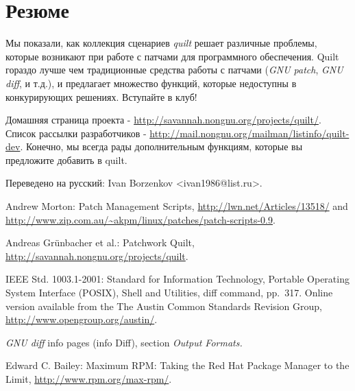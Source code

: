 \documentclass{article}
\newcommand{\prog}[1]{\textit{#1}}
\begin{document}


\section{Резюме}

Мы показали, как коллекция сценариев \textit{quilt} решает различные проблемы, которые возникают при работе с патчами для программного обеспечения. Quilt гораздо лучше чем традиционные средства работы с патчами (\prog{GNU patch}, \prog{GNU diff}, и т.д.), и предлагает множество функций, которые недоступны в конкурирующих решениях. Вступайте в клуб!

Домашняя страница проекта - \url{http://savannah.nongnu.org/projects/quilt/}. Список рассылки разработчиков - \url{http://mail.nongnu.org/mailman/listinfo/quilt-dev}.
Конечно, мы всегда рады дополнительным функциям, которые вы предложите добавить в quilt.

Переведено на русский: Ivan Borzenkov <ivan1986@list.ru>.

\begin{thebibliography}{XX}

Andrew Morton: Patch Management Scripts,
\url{http://lwn.net/Articles/13518/} and
\url{http://www.zip.com.au/~akpm/linux/patches/patch-scripts-0.9}.

Andreas Grünbacher et al.: Patchwork Quilt,
\url{http://savannah.nongnu.org/projects/quilt}.

IEEE Std. 1003.1-2001: Standard for Information Technology, Portable
Operating System Interface (POSIX), Shell and Utilities, diff
command, pp.~317. Online version available from the The Austin Common
Standards Revision Group, \url{http://www.opengroup.org/austin/}.

\textit{GNU diff} info pages (\textsf{info Diff}), section \textit{Output
Formats.}

Edward C. Bailey: Maximum RPM: Taking the Red Hat Package Manager to the
Limit, \url{http://www.rpm.org/max-rpm/}.

\end{thebibliography}

\end{document}
